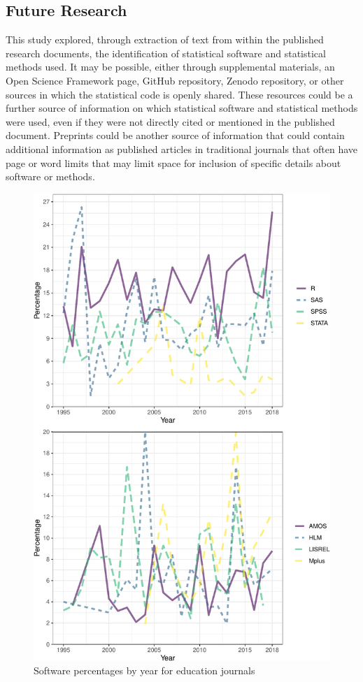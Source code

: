 \documentclass[
  english,
  ,man]{apa6}
\begin{document}
\hypertarget{future-research}{%
\subsection{Future Research}\label{future-research}}

This study explored, through extraction of text from within the published research documents, the identification of statistical software and statistical methods used. It may be possible, either through supplemental materials, an Open Science Framework page, GitHub repository, Zenodo repository, or other sources in which the statistical code is openly shared. These resources could be a further source of information on which statistical software and statistical methods were used, even if they were not directly cited or mentioned in the published document. Preprints could be another source of information that could contain additional information as published articles in traditional journals that often have page or word limits that may limit space for inclusion of specific details about software or methods.

\newpage

\begin{figure}
\centering
\includegraphics{software_files/figure-latex/software-year-at1-1.pdf}
\caption{\label{fig:software-year-at1}Software percentages by year for education journals}
\end{figure}
\end{document}

